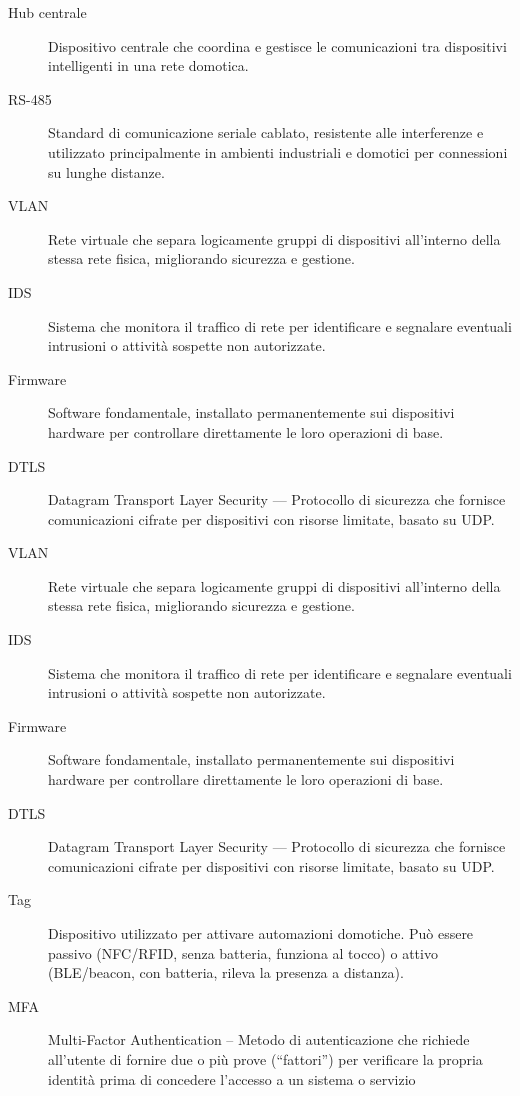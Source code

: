 \begin{description}
    \item[Hub centrale] Dispositivo centrale che coordina e gestisce le comunicazioni tra dispositivi intelligenti in una rete domotica.
    \item[RS-485] Standard di comunicazione seriale cablato, resistente alle interferenze e utilizzato principalmente in ambienti industriali e domotici per connessioni su lunghe distanze.
    \item[VLAN] Rete virtuale che separa logicamente gruppi di dispositivi all'interno della stessa rete fisica, migliorando sicurezza e gestione.
    \item[IDS] Sistema che monitora il traffico di rete per identificare e segnalare eventuali intrusioni o attività sospette non autorizzate.
    \item[Firmware] Software fondamentale, installato permanentemente sui dispositivi hardware per controllare direttamente le loro operazioni di base.
    \item[DTLS] Datagram Transport Layer Security --- Protocollo di sicurezza che fornisce comunicazioni cifrate per dispositivi con risorse limitate, basato su UDP.
    \item[VLAN] Rete virtuale che separa logicamente gruppi di dispositivi all'interno della stessa rete fisica, migliorando sicurezza e gestione.
    \item[IDS] Sistema che monitora il traffico di rete per identificare e segnalare eventuali intrusioni o attività sospette non autorizzate.
    \item[Firmware] Software fondamentale, installato permanentemente sui dispositivi hardware per controllare direttamente le loro operazioni di base.
    \item[DTLS] Datagram Transport Layer Security --- Protocollo di sicurezza che fornisce comunicazioni cifrate per dispositivi con risorse limitate, basato su UDP.
    \item[Tag] Dispositivo utilizzato per attivare automazioni domotiche. Può essere passivo (NFC/RFID, senza batteria, funziona al tocco) o attivo (BLE/beacon, con batteria, rileva la presenza a distanza).
    \item[MFA] Multi-Factor Authentication – Metodo di autenticazione che richiede all’utente di fornire due o più prove (“fattori”) per verificare la propria identità prima di concedere l’accesso a un sistema o servizio
\end{description}